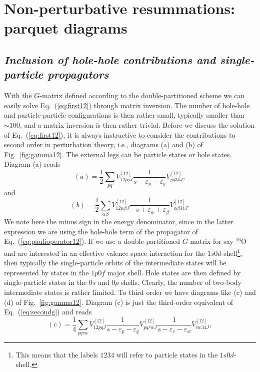 \documentclass{article}
\begin{document}
\section{Non-perturbative resummations: parquet diagrams}
\label{sec:sec5}

\subsection{\it Inclusion of hole-hole contributions and single-particle propagators}

With the $G$-matrix defined according
to the double-partitioned scheme we can easily solve Eq.\ (\ref{eq:first12})
through matrix inversion. The number of hole-hole and particle-particle
configurations is then rather small, typically smaller than
$\sim  100$, and a matrix inversion
is then rather trivial.
Before we discuss the solution of Eq.\ (\ref{eq:first12}), it is always
instructive to consider the contributions to second order in
perturbation theory, i.e., diagrams (a) and (b) of Fig.\
\ref{fig:gamma12}. The external legs can be
particle states or hole states. Diagram (a) reads
\begin{equation}
      (a)=\frac{1}{2}\sum_{pq}V^{[12]}_{12pq J}
      \frac{1}{s-\varepsilon_p-
                \varepsilon_q} V^{[12]}_{pq34 J},
      \label{eq:secondg}
\end{equation}
and
\begin{equation}
      (b)=\frac{1}{2}\sum_{\alpha\beta}V^{[12]}_{12\alpha\beta J}
      \frac{1}{-s+\varepsilon_{\alpha}+
                \varepsilon_{\beta}} V^{[12]}_{\alpha\beta 34 J}.
\end{equation}
We note here the minus sign in the energy denominator,
since in the latter expression we are using
the hole-hole term of the propagator of
Eq.\ (\ref{eq:paulioperator12}).
If we use a double-partitioned $G$-matrix for say $^{16}$O and
are interested in an effective valence space interaction
for the $1s0d$-shell\footnote{This means that the labels $1234$ will
refer to particle states in the $1s0d$-shell.}, then typically
the single-particle orbits of the intermediate states will be represented
by states in the $1p0f$ major shell. Hole states are then defined
by single-particle states in the $0s$ and $0p$ shells.
Clearly, the number of two-body intermediate states is rather limited.
To third order we have diagrams like (c) and (d) of Fig.\
\ref{fig:gamma12}. Diagram (c) is just the third-order equivalent of
Eq.\ (\ref{eq:secondg}) and reads
\begin{equation}
      (c)=\frac{1}{4}\sum_{pqrw}V^{[12]}_{12pq J}
      \frac{1}{s-\varepsilon_p-
                \varepsilon_q}
      V^{[12]}_{pqrw J}
      \frac{1}{s-\varepsilon_r-
                \varepsilon_w}
       V^{[12]}_{rw34 J},
      \label{eq:thirdg}
\end{equation}
\end{document}
